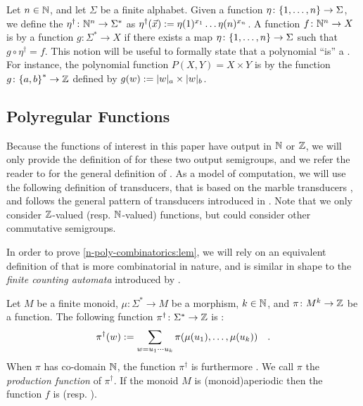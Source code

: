 \AP Let $n \in \mathbb{N}$, and let $\Sigma$ be a finite alphabet. Given a function
$\eta \colon \mathopen{\{} 1, \dots, n \mathclose{\}} \to \Sigma$, we define the $\eta^\dagger \colon
\mathbb{N}^n \to \Sigma^*$ as $\eta^\dagger(\vec{x}) \mathrel{:=} \eta(1)^{x_1} \dots
\eta(n)^{x_n}$. A function $f \colon \mathbb{N}^n \to X$ is  by a
 function $g \colon \Sigma^* \to X$ if there exists a map $\eta
\colon \mathopen{\{} 1, \dots, n \mathclose{\}} \to \Sigma$ such that $g \circ \eta^\dagger = f$. This
notion will be useful to formally state that a polynomial ``is'' a
 . For instance, the polynomial
function $P(X,Y) = X \times Y$ is  by the 
function $g \colon \mathopen{\{} a,b \mathclose{\}}^* \to \mathbb{Z}$ defined by $g(w) \defined \card[a]{w}
\times \card[b]{w}$.

\subsection{Polyregular Functions}
\label{polyregular:sec}

\AP Because the functions of interest in this paper have output in $\mathbb{N}$ or
$\mathbb{Z}$, we will only provide the definition of  for
these two output semigroups, and we refer the reader to \cite{BOKL19} for the
general definition of . As a model of computation, we
will use the following definition of transducers, that is based on the marble
transducers \cite{EHB99}, and follows the general pattern of transducers
introduced in \cite{CDTL23}. Note that we only consider $\mathbb{Z}$-valued (resp.
$\mathbb{N}$-valued) functions, but could consider other commutative semigroups.

\AP In order to prove \cref{n-poly-combinatorics:lem}, we will rely on an
equivalent definition of  that is more
combinatorial in nature, and is similar in shape to the \emph{finite counting
automata} introduced by \cite{SCHU62}.

\begin{lemma}
    \label{nat-rel-poly:def}
    Let $M$ be a finite monoid, $\mu \colon \Sigma^* \to M$
    be a morphism, $k \in \mathbb{N}$, and 
    $\pi \colon M^k \to \mathbb{Z}$ be a function.
    The following function 
    $\pi^\dagger \colon \Sigma^* \to \mathbb{Z}$
    is :
    \begin{equation*}
        \pi^\dagger (w) \mathrel{:=}
        \sum_{w = u_1 \cdots u_k} \pi(\mu(u_1), \dots, \mu(u_k))
        \quad .
    \end{equation*}
    When $\pi$ has co-domain $\mathbb{N}$, the function $\pi^\dagger$
    is furthermore .
    We call $\pi$ the \emph{production function} of $\pi^\dagger$.
    If the monoid $M$ is \kl(monoid){aperiodic}
    then
    the function $f$ is 
    (resp. ).
\end{lemma}

